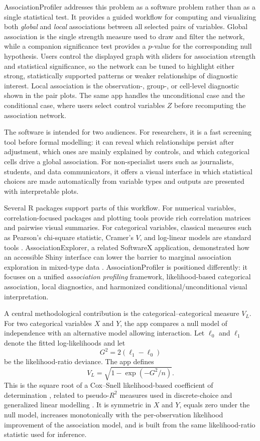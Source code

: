 \documentclass[preprint,12pt,a4paper]{elsarticle}
\begin{document}
AssociationProfiler addresses this problem as a software problem rather than as a single statistical test. It provides a guided workflow for computing and visualizing both \emph{global} and \emph{local} associations between all selected pairs of variables. Global association is the single strength measure used to draw and filter the network, while a companion significance test provides a $p$-value for the corresponding null hypothesis. Users control the displayed graph with sliders for association strength and statistical significance, so the network can be tuned to highlight either strong, statistically supported patterns or weaker relationships of diagnostic interest. Local association is the observation-, group-, or cell-level diagnostic shown in the pair plots. The same app handles the unconditional case and the conditional case, where users select control variables $Z$ before recomputing the association network.

The software is intended for two audiences. For researchers, it is a fast screening tool before formal modelling: it can reveal which relationships persist after adjustment, which ones are mainly explained by controls, and which categorical cells drive a global association. For non-specialist users such as journalists, students, and data communicators, it offers a visual interface in which statistical choices are made automatically from variable types and outputs are presented with interpretable plots.

Several R packages support parts of this workflow. For numerical variables, correlation-focused packages and plotting tools provide rich correlation matrices and pairwise visual summaries. For categorical variables, classical measures such as Pearson's chi-square statistic, Cramer's $V$, and log-linear models are standard tools \cite{pearson1900,cramer1946,agresti2013}. AssociationExplorer, a related SoftwareX application, demonstrated how an accessible Shiny interface can lower the barrier to marginal association exploration in mixed-type data \cite{soetewey2026}. AssociationProfiler is positioned differently: it focuses on a unified \emph{association profiling} framework, likelihood-based categorical association, local diagnostics, and harmonized conditional/unconditional visual interpretation.

A central methodological contribution is the categorical--categorical measure $V_L$. For two categorical variables $X$ and $Y$, the app compares a null model of independence with an alternative model allowing interaction. Let $\ell_0$ and $\ell_1$ denote the fitted log-likelihoods and let
\[
G^2 = 2(\ell_1-\ell_0)
\]
be the likelihood-ratio deviance. The app defines
\[
V_L = \sqrt{1-\exp(-G^2/n)}.
\]
This is the square root of a Cox--Snell likelihood-based coefficient of determination \cite{coxsnell1989}, related to pseudo-$R^2$ measures used in discrete-choice and generalized linear modelling \cite{mcfadden1974,nagelkerke1991}. It is symmetric in $X$ and $Y$, equals zero under the null model, increases monotonically with the per-observation likelihood improvement of the association model, and is built from the same likelihood-ratio statistic used for inference.
\end{document}
